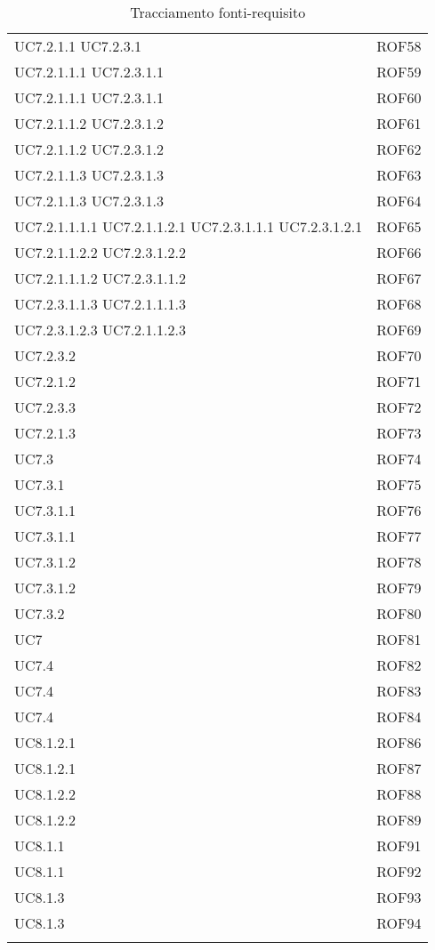 \documentclass[../AnalisiDeiRequisiti_v4.0.0.tex]{subfiles}
\begin{document}
\begin{longtable}{p{4cm}!{\VRule[1pt]}p{4cm}}
UC7.2.1.1 UC7.2.3.1 & ROF58 \\
UC7.2.1.1.1 UC7.2.3.1.1 & ROF59 \\
UC7.2.1.1.1 UC7.2.3.1.1 & ROF60 \\
UC7.2.1.1.2 UC7.2.3.1.2 & ROF61 \\
UC7.2.1.1.2 UC7.2.3.1.2 & ROF62 \\
UC7.2.1.1.3 UC7.2.3.1.3 & ROF63 \\
UC7.2.1.1.3 UC7.2.3.1.3 & ROF64 \\
UC7.2.1.1.1.1 UC7.2.1.1.2.1 UC7.2.3.1.1.1 UC7.2.3.1.2.1 & ROF65 \\
UC7.2.1.1.2.2 UC7.2.3.1.2.2 & ROF66 \\
UC7.2.1.1.1.2 UC7.2.3.1.1.2 & ROF67 \\
UC7.2.3.1.1.3 UC7.2.1.1.1.3 & ROF68 \\
UC7.2.3.1.2.3 UC7.2.1.1.2.3 & ROF69 \\
UC7.2.3.2 & ROF70 \\
UC7.2.1.2 & ROF71 \\
UC7.2.3.3 & ROF72 \\
UC7.2.1.3 & ROF73 \\
UC7.3 & ROF74 \\
UC7.3.1 & ROF75 \\
UC7.3.1.1 & ROF76 \\
UC7.3.1.1 & ROF77 \\
UC7.3.1.2 & ROF78 \\
UC7.3.1.2 & ROF79 \\
UC7.3.2 & ROF80 \\
UC7 & ROF81 \\
UC7.4 & ROF82 \\
UC7.4 & ROF83 \\
UC7.4 & ROF84 \\
UC8.1.2.1 & ROF86 \\
UC8.1.2.1 & ROF87 \\
UC8.1.2.2 & ROF88 \\
UC8.1.2.2 & ROF89 \\
UC8.1.1 & ROF91 \\
UC8.1.1 & ROF92 \\
UC8.1.3 & ROF93 \\
UC8.1.3 & ROF94 \\

\caption{Tracciamento fonti-requisito}
\end{longtable}
		
\newpage
\end{document}
